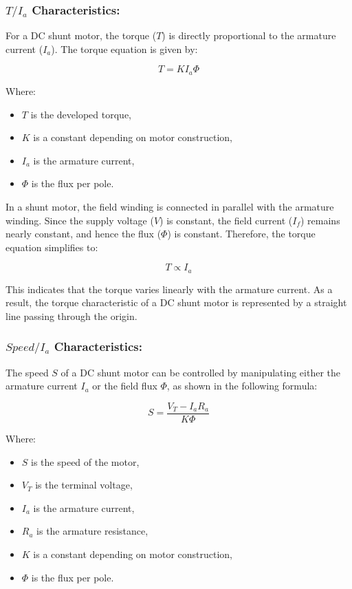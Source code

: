 \documentclass[a4paper,12pt]{article}
\begin{document}
	\subsubsection{$T / I_a$ Characteristics:}
	For a DC shunt motor, the torque (\(T\)) is directly proportional to the armature current (\(I_a\)). The torque equation is given by:
	
	\begin{equation}
		T = K I_a \Phi
	\end{equation}
	
	Where:
	\begin{itemize}
		\item \(T\) is the developed torque,
		\item \(K\) is a constant depending on motor construction,
		\item \(I_a\) is the armature current,
		\item \(\Phi\) is the flux per pole.
	\end{itemize}
	
	In a shunt motor, the field winding is connected in parallel with the armature winding. Since the supply voltage (\(V\)) is constant, the field current (\(I_f\)) remains nearly constant, and hence the flux (\(\Phi\)) is constant. Therefore, the torque equation simplifies to:
	
	\begin{equation}
		T \propto I_a
	\end{equation}
	
	This indicates that the torque varies linearly with the armature current. As a result, the torque characteristic of a DC shunt motor is represented by a straight line passing through the origin.
	\subsubsection{$Speed / I_a$ Characteristics:}
	The speed \( S \) of a DC shunt motor can be controlled by manipulating either the armature current \( I_a \) or the field flux \( \Phi \), as shown in the following formula:
	
	\[
	S = \frac{V_T - I_a R_a}{K \Phi}
	\]
	
	
	Where:
	\begin{itemize}
		\item \(S\) is the speed of the motor,
		\item \(V_T\) is the terminal voltage,
		\item \(I_a\) is the armature current,
		\item \(R_a\) is the armature resistance,
		\item \(K\) is a constant depending on motor construction,
		\item \(\Phi\) is the flux per pole.
	\end{itemize}
	
\end{document}
